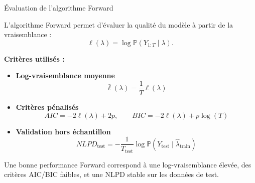\documentclass{beamer}
\begin{document}
\begin{frame}{Évaluation de l'algorithme Forward}

\small

L'algorithme Forward permet d'évaluer la qualité du modèle à partir de la vraisemblance :
\[
\ell(\lambda)=\log \mathbb{P}(Y_{1:T}\mid \lambda).
\]

\vspace{0.25cm}

\textbf{Critères utilisés :}

\begin{itemize}
    \item \textbf{Log-vraisemblance moyenne}
    \[
    \bar{\ell}(\lambda)=\frac{1}{T}\ell(\lambda)
    \]

    \item \textbf{Critères pénalisés}
    \[
    AIC=-2\ell(\lambda)+2p,
    \qquad
    BIC=-2\ell(\lambda)+p\log(T)
    \]

    \item \textbf{Validation hors échantillon}
    \[
    NLPD_{\text{test}}
    =
    -\frac{1}{T_{\text{test}}}
    \log \mathbb{P}(Y_{\text{test}}\mid \widehat{\lambda}_{\text{train}})
    \]
\end{itemize}

\vspace{0.1cm}

\scriptsize
Une bonne performance Forward correspond à une log-vraisemblance élevée, des critères AIC/BIC faibles, et une NLPD stable sur les données de test.

\end{frame}
\end{document}
